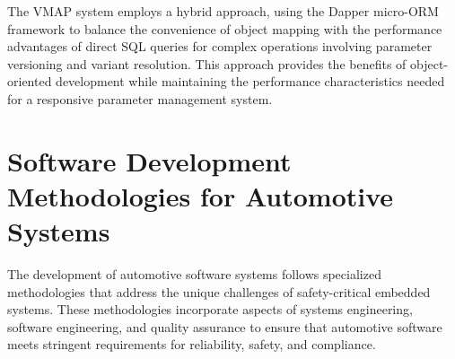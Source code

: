 The VMAP system employs a hybrid approach, using the Dapper micro-ORM framework to balance the convenience of object mapping with the performance advantages of direct SQL queries for complex operations involving parameter versioning and variant resolution. This approach provides the benefits of object-oriented development while maintaining the performance characteristics needed for a responsive parameter management system.

\section{Software Development Methodologies for Automotive Systems}
\label{sec:software-development-methodologies}

The development of automotive software systems follows specialized methodologies that address the unique challenges of safety-critical embedded systems. These methodologies incorporate aspects of systems engineering, software engineering, and quality assurance to ensure that automotive software meets stringent requirements for reliability, safety, and compliance.





